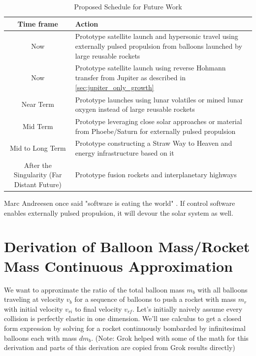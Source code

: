 \documentclass{article}
\begin{document}
\begin{table}[htpb]
    \centering
    \begin{tabularx}{\textwidth}{|c|L|}\hline
        \textbf{Time frame} & \textbf{Action} \\\hline
        Now & Prototype satellite launch and hypersonic travel using externally pulsed propulsion from balloons launched by large reusable rockets\\\hline
        Now & Prototype satellite launch using reverse Hohmann transfer from Jupiter as described in \autoref{sec:jupiter_only_growth} \\\hline
        Near Term & Prototype launches using lunar volatiles or mined lunar oxygen instead of large reusable rockets \\\hline
        Mid Term & Prototype leveraging close solar approaches or material from Phoebe/Saturn for externally  pulsed propulsion \\\hline
        Mid to Long Term & Prototype constructing a Straw Way to Heaven and energy infrastructure based on it \\\hline
        After the Singularity (Far Distant Future) & Prototype fusion rockets and interplanetary highways \\\hline
    \end{tabularx}
    \caption{Proposed Schedule for Future Work}
    \label{tab:schedule_future_work}
\end{table}

Marc Andreesen once said "software is eating the world" \cite{andreessen_software}.   If control software enables externally pulsed propulsion, it will devour the solar system as well.

\appendix 
\section{Derivation of Balloon Mass/Rocket Mass Continuous Approximation}\label{sec:balloon_ratio_approximation}  We want to approximate the ratio of the total balloon mass \(m_b\) with all balloons traveling at velocity \(v_b\) for a sequence of balloons to push a rocket with mass \(m_r\) with initial velocity \(v_{ri}\) to final velocity \(v_{rf}\).   Let's initially naively assume every collision is perfectly elastic in one dimension.   We'll use calculus to get a  closed form expression by solving for a rocket  continuously bombarded by infinitesimal balloons each with mass \(dm_b\).   (Note: Grok \cite{grok}  helped with some of the math for this derivation and parts of this derivation are copied from Grok  results directly)
\end{document}
